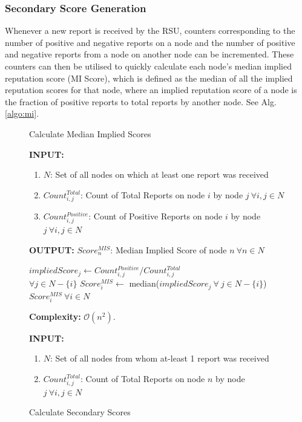 \documentclass[journal]{IEEEtran}
\makeatletter
\newcommand{\removelatexerror}{\let\@latex@error\@gobble}
\makeatother
\begin{document}
\subsubsection{Secondary Score Generation}
Whenever a new report is received by the RSU, counters corresponding to the number of positive and negative reports on a node and the number of positive and negative reports from a node on another node can be incremented. These counters can then be utilised to quickly calculate each node's median implied reputation score (MI Score), which is defined as the median of all the implied reputation scores for that node, where an implied reputation score of a node is the fraction of positive reports to total reports by another node. See %
Alg. \ref{algo:mi}.
\begin{figure}[!t]\removelatexerror
	\label{fig:ALG_ss}
\begin{algorithm}[H]
	\caption{Calculate Median Implied Scores}  
	\label{algo:mi} 
	\textbf{INPUT:} 
	\begin{enumerate}
		\item $N$: Set of all nodes on which at least one report was received
		\item $Count^{Total}_{i,j}$: Count of Total Reports on node $ i $ by node $ j \ \forall i,j\in N $
		\item $Count^{Positive}_{i,j}$: Count of Positive Reports on node $ i $ by node $ j \ \forall i,j\in N $
	\end{enumerate}
	\textbf{OUTPUT:}  $Score^{MIS}_n$: Median Implied Score of node $n\ \forall n\in N$
	\begin{algorithmic}[1]
			\STATE $impliedScore_{j} \leftarrow Count^{Positive}_{i,j} / Count^{Total}_{i,j}$\\$\forall j \in N-\{i\} $
			\STATE $ Score^{MIS}_i \leftarrow$ median($impliedScore_j\ \forall\ j\in N-\{i\}$)
		\ENDFOR
		\RETURN $Score^{MIS}_i\ \forall i\in N$
	\end{algorithmic}
	\textbf{Complexity:} $\mathcal{O}(n^2)$.
\end{algorithm}
\begin{algorithm}[H]
	\caption{Calculate Secondary Scores}
	\label{algo:SSCalc}
	\textbf{INPUT:} 
	\begin{enumerate}
		\item $N$: Set of all nodes from whom at-least 1 report was received
		\item $Count^{Total}_{i,j}$: Count of Total Reports on node $ n $ by node $ j \ \forall i,j\in N $

\end{enumerate}
\end{algorithm}
\end{figure}
\end{document}
